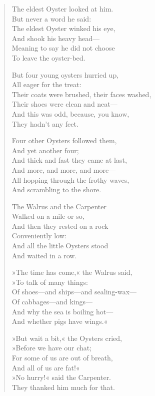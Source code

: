 \begin{verse}
The eldest Oyster looked at him.\\
\vin But never a word he said:\\
The eldest Oyster winked his eye,\\
\vin And shook his heavy head—\\
Meaning to say he did not choose\\
\vin To leave the oyster-bed.

But four young oysters hurried up,\\
\vin All eager for the treat:\\
Their coats were brushed, their faces washed,\\
\vin Their shoes were clean and neat—\\
And this was odd, because, you know,\\
\vin They hadn't any feet.

Four other Oysters followed them,\\
\vin And yet another four;\\
And thick and fast they came at last,\\
\vin And more, and more, and more—\\
All hopping through the frothy waves,\\
\vin And scrambling to the shore.

The Walrus and the Carpenter\\
\vin Walked on a mile or so,\\
And then they rested on a rock\\
\vin Conveniently low:\\
And all the little Oysters stood\\
\vin And waited in a row.

»The time has come,« the Walrus said,\\
\vin »To talk of many things:\\
Of shoes—and ships—and sealing-wax—\\
\vin Of cabbages—and kings—\\
And why the sea is boiling hot—\\
\vin And whether pigs have wings.«

»But wait a bit,« the Oysters cried,\\
\vin »Before we have our chat;\\
For some of us are out of breath,\\
\vin And all of us are fat!«\\
»No hurry!« said the Carpenter.\\
\vin They thanked him much for that.


\end{verse}
